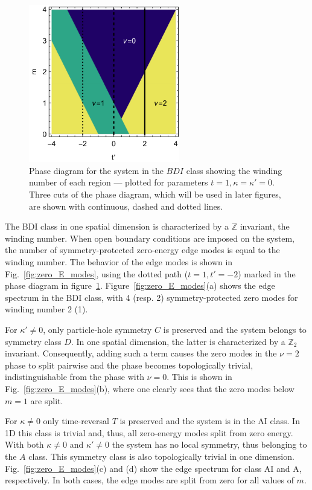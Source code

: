 \documentclass[twocolumn,amsmath,longbibliography,amssymb,superscriptaddress]{revtex4-1}
\begin{document}
\begin{figure}[t]
	\centering
	\includegraphics[width=66mm]{fig1.pdf}
	\caption{Phase diagram for the system in the $BDI$ class showing the winding number of each region --- plotted for parameters $t = 1,\kappa =\kappa'=0$. Three cuts of the phase diagram, which will be used in later figures,  are shown with continuous, dashed and dotted lines.}
\label{fig:bdi_phase_diagram}
\end{figure}

The BDI class  in one spatial dimension  is characterized by a $\mathbb{Z}$ invariant, the winding number.
When open boundary conditions are imposed on the system, the number of symmetry-protected zero-energy edge modes is equal to the winding number. 
The behavior of the  edge modes  is  shown in Fig.~\ref{fig:zero_E_modes}, using the dotted path ($t=1,t'=-2$) marked in the phase diagram in figure~\ref{fig:bdi_phase_diagram}. 
Figure~\ref{fig:zero_E_modes}(a) shows the edge spectrum in the BDI class, with 4 (resp. 2) symmetry-protected zero modes for winding number 2 (1). 


For $\kappa' \neq 0$, only particle-hole symmetry $C$ is preserved and the system belongs to symmetry class $D$. 
In one spatial dimension, the latter is characterized by a $\mathbb{Z}_2$ invariant.  
Consequently, adding such a term causes the zero modes in the $\nu=2$ phase to split pairwise and the phase becomes topologically trivial, indistinguishable from the phase with $\nu=0$.
This is shown in Fig.~\ref{fig:zero_E_modes}(b), where one clearly sees that the zero modes below $m=1$ are split. 

For $\kappa \neq 0$ only time-reversal $T$ is preserved and the system is in the AI class. 
In 1D this class is trivial and, thus,  all zero-energy modes split from zero energy. 
With both $\kappa \neq 0$ and $\kappa' \neq0$ the system has no local symmetry, thus belonging to the $A$ class.  
This symmetry class is also topologically trivial in one dimension. 
Fig.~\ref{fig:zero_E_modes}(c) and (d) show the edge spectrum for class AI and A, respectively. In both cases, the edge modes are split from zero for all values of $m$.
\end{document}
